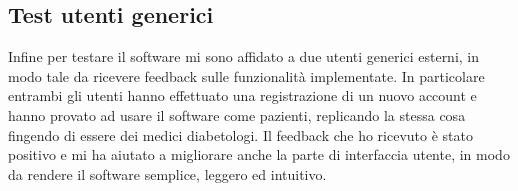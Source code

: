 \documentclass{article}
\begin{document}
\subsection{Test utenti generici}
Infine per testare il software mi sono affidato a due utenti generici esterni, in modo tale da ricevere feedback sulle
funzionalità implementate.
In particolare entrambi gli utenti hanno effettuato una registrazione di un nuovo account e hanno provato ad usare il software come
pazienti, replicando la stessa cosa fingendo di essere dei medici diabetologi.
Il feedback che ho ricevuto è stato positivo e mi ha aiutato a migliorare anche la parte di interfaccia utente, in modo da rendere
il software semplice, leggero ed intuitivo.
\end{document}
